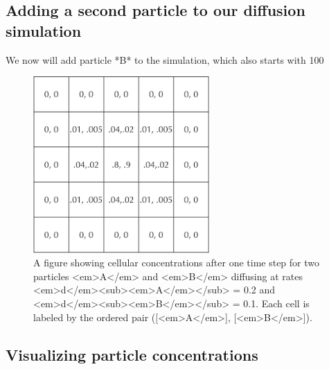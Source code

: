 {{\FloatBarrier
{}
\subsection{Adding a second particle to our diffusion simulation}

We now will add particle *B* to the simulation, which also starts with 100%

\begin{figure}[h]
\centering
\mySfFamily
\includegraphics[width = 0.6\textwidth]{../assets/images/600px/two_particle_concentration_diffusion.png}
\caption{A figure showing cellular concentrations after one time step for two particles <em>A</em> and <em>B</em> diffusing at rates <em>d</em><sub><em>A</em></sub> = 0.2 and <em>d</em><sub><em>B</em></sub> = 0.1. Each cell is labeled by the ordered pair ([<em>A</em>], [<em>B</em>]).}
\label{fig:two_particle_concentration_diffusion}
\end{figure}

\begin{qbox}[%
Update the cells in the above figure after another generation of diffusion. Use the diffusion rates <em>d</em><sub><em>A</em></sub> = 0.2 and <em>d</em><sub><em>B</em></sub> = 0.1.
]\end{qbox}

\FloatBarrier
{}
\subsection{Visualizing particle concentrations}

}}

